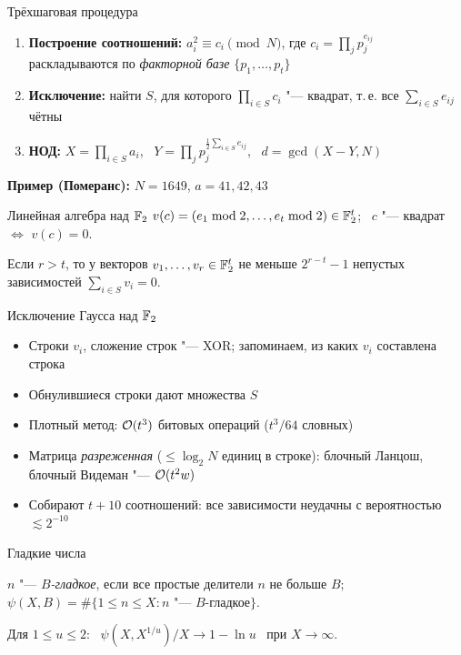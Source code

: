 \documentclass{ca-slides}
\begin{document}
\begin{canvasframe}{Трёхшаговая процедура}
  \begin{enumerate}
    \item \textbf{Построение соотношений:} $a_i^2 \equiv c_i \pmod N$, где
      $c_i = \prod_j p_j^{e_{ij}}$ раскладываются по \emph{факторной базе} $\{p_1, \dots, p_t\}$
    \item \textbf{Исключение:} найти $S$, для которого $\prod_{i \in S} c_i$ "--- квадрат,
      т.\,е. все $\sum_{i \in S} e_{ij}$ чётны
    \item \textbf{НОД:} $X = \prod_{i \in S} a_i$, \ $Y = \prod_j p_j^{\frac12\sum_{i \in S} e_{ij}}$,
      \ $d = \gcd(X - Y, N)$
  \end{enumerate}
  \textbf{Пример (Померанс):} $N = 1649$, $a = 41, 42, 43$
  \vfill
\end{canvasframe}

\begin{theoremframe}[proposition]{Линейная алгебра над $\mathbb{F}_{2}$}
  $v(c) = (e_1 \bmod 2, \dots, e_t \bmod 2) \in \mathbb{F}_{2}^t$; \ $c$ "--- квадрат $\iff$ $v(c) = 0$.
  \par Если $r > t$, то у векторов $v_1, \dots, v_r \in \mathbb{F}_{2}^t$ не меньше $2^{r-t} - 1$
  непустых зависимостей $\sum_{i \in S} v_i = 0$.
\end{theoremframe}

\begin{canvasframe}{Исключение Гаусса над $\mathbb{F}_{2}$}
  \begin{itemize}
    \item Строки $v_i$, сложение строк "--- XOR; запоминаем, из каких $v_i$ составлена строка
    \item Обнулившиеся строки дают множества $S$
    \item Плотный метод: $\mathcal{O}(t^3)$ битовых операций ($t^3/64$ словных)
    \item Матрица \emph{разреженная} ($\le \log_2 N$ единиц в строке): блочный Ланцош,
      блочный Видеман "--- $\mathcal{O}(t^2 w)$
    \item Собирают $t + 10$ соотношений: все зависимости неудачны с вероятностью $\lesssim 2^{-10}$
  \end{itemize}
  \vfill
\end{canvasframe}

\begin{canvasframe}{Гладкие числа}
  \begin{definition}
    $n$ "--- \emph{$B$-гладкое}, если все простые делители $n$ не больше $B$;
    $\psi(X, B) = \#\{1 \le n \le X : n \text{ "--- } B\text{-гладкое}\}$.
  \end{definition}
  \begin{proposition}
    Для $1 \le u \le 2$: \ $\psi(X, X^{1/u}) / X \to 1 - \ln u$ \ при $X \to \infty$.
  \end{proposition}
  \vfill
\end{canvasframe}
\end{document}
